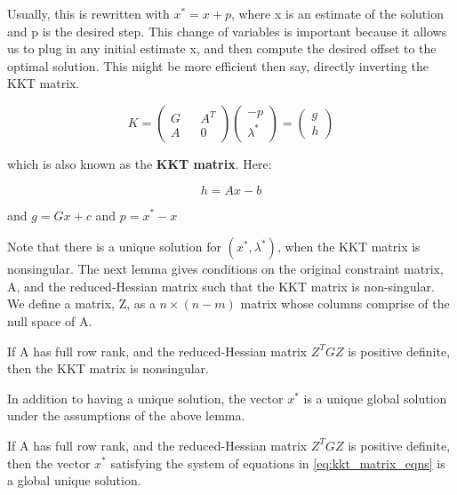 \documentclass[class=article, crop=false]{standalone}
\begin{document}
		Usually, this is rewritten with $x^* = x + p$, where x is an estimate of the solution and p is the desired step. This change of variables is important because it allows us to plug in any initial estimate x, and then compute the desired offset to the optimal solution. This might be more efficient then say, directly inverting the KKT matrix.

		\begin{equation}
		\label{eq:kkt_matrix_eqns}
			K = \begin{pmatrix} G && A^T \\ A && 0 \end{pmatrix} \begin{pmatrix} -p \\ \lambda^* \end{pmatrix} = \begin{pmatrix} g \\ h \end{pmatrix}
		\end{equation}

		which is also known as the \textbf{KKT matrix}. Here:

			$$h = Ax-b$$

		and $g = Gx + c$ and $p = x^* - x$

		Note that there is a unique solution for $(x^*, \lambda^*)$, when the KKT matrix is nonsingular. The next lemma gives conditions on the original constraint matrix, A, and the reduced-Hessian matrix such that the KKT matrix is non-singular. We define a matrix, Z, as a $n \times (n-m)$ matrix whose columns comprise of the null space of A. 

		\begin{lemma} 
			If A has full row rank, and the reduced-Hessian matrix $Z^T G Z$ is positive definite, then the KKT matrix is nonsingular.
		\end{lemma}

		In addition to having a unique solution, the vector $x^*$ is a unique global solution under the assumptions of the above lemma.

		\begin{theorem} 
			If A has full row rank, and the reduced-Hessian matrix $Z^T G Z$ is positive definite, then the vector $x^*$ satisfying the system of equations in \ref{eq:kkt_matrix_eqns} is a global unique solution.
		\end{theorem}
\end{document}
